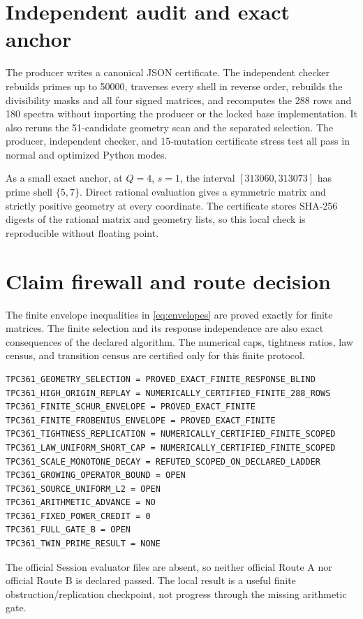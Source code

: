 \documentclass[10pt]{article}
\begin{document}
\section{Independent audit and exact anchor}

The producer writes a canonical JSON certificate.  The independent checker
rebuilds primes up to 50000, traverses every shell in reverse order, rebuilds
the divisibility masks and all four signed matrices, and recomputes the 288
rows and 180 spectra without importing the producer or the locked base
implementation.  It also reruns the 51-candidate geometry scan and the
separated selection.  The producer, independent checker, and 15-mutation
certificate stress test all pass in normal and optimized Python modes.

As a small exact anchor, at $Q=4$, $s=1$, the interval
$[313060,313073]$ has prime shell $\{5,7\}$.  Direct rational evaluation
gives a symmetric matrix and strictly positive geometry at every coordinate.
The certificate stores SHA-256 digests of the rational matrix and geometry
lists, so this local check is reproducible without floating point.

\section{Claim firewall and route decision}

The finite envelope inequalities in \eqref{eq:envelopes} are proved exactly
for finite matrices.  The finite selection and its response independence are
also exact consequences of the declared algorithm.  The numerical caps,
tightness ratios, law census, and transition census are certified only for
this finite protocol.

\begin{verbatim}
TPC361_GEOMETRY_SELECTION = PROVED_EXACT_FINITE_RESPONSE_BLIND
TPC361_HIGH_ORIGIN_REPLAY = NUMERICALLY_CERTIFIED_FINITE_288_ROWS
TPC361_FINITE_SCHUR_ENVELOPE = PROVED_EXACT_FINITE
TPC361_FINITE_FROBENIUS_ENVELOPE = PROVED_EXACT_FINITE
TPC361_TIGHTNESS_REPLICATION = NUMERICALLY_CERTIFIED_FINITE_SCOPED
TPC361_LAW_UNIFORM_SHORT_CAP = NUMERICALLY_CERTIFIED_FINITE_SCOPED
TPC361_SCALE_MONOTONE_DECAY = REFUTED_SCOPED_ON_DECLARED_LADDER
TPC361_GROWING_OPERATOR_BOUND = OPEN
TPC361_SOURCE_UNIFORM_L2 = OPEN
TPC361_ARITHMETIC_ADVANCE = NO
TPC361_FIXED_POWER_CREDIT = 0
TPC361_FULL_GATE_B = OPEN
TPC361_TWIN_PRIME_RESULT = NONE
\end{verbatim}

The official Session evaluator files are absent, so neither official Route A
nor official Route B is declared passed.  The local result is a useful
finite obstruction/replication checkpoint, not progress through the missing
arithmetic gate.
\end{document}
